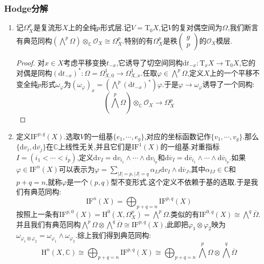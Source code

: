 \subsubsection{Hodge分解}

\begin{enumerate}
	\item 记$\Omega_X^p$是复流形$X$上的全纯$p$形式层.记$V=\mathrm{T}_0X$,记$V$的复对偶空间为$\Omega$,我们断言有典范同构$\left(\bigwedge^p\Omega\right)\otimes_{\mathbb{C}}\mathscr{O}_X\cong\Omega_X^p$.特别的有$\Omega_X^p$是秩$\left(\begin{array}{c}g\\p\end{array}\right)$的$\mathscr{O}_X$模层.
	\begin{proof}
		
		对$x\in X$考虑平移变换$t_{-x}$,它诱导了切空间同构$\mathrm{d}t_{-x}:\mathrm{T}_xX\to\mathrm{T}_0X$,它的对偶是同构$(\mathrm{d}t_{-x})^*:\Omega=\Omega_{X,0}^1\to\Omega_{X,x}^1$.任取$\varphi\in\bigwedge^p\Omega$,定义$X$上的一个平移不变全纯$p$形式$\omega_{\varphi}$为$(\omega_{\varphi})_x=\left(\bigwedge^p(\mathrm{d}t_{-x})^*\right)\varphi$.于是$\varphi\to\omega_{\varphi}$诱导了一个同构:
		$$\left(\bigwedge^p\Omega\right)\otimes_{\mathbb{C}}\mathscr{O}_X\to\Omega_X^p$$
	\end{proof}
    \item 定义$\mathrm{IF}^{p,q}(X)$.选取$V$的一组基$\{e_1,\cdots,e_g\}$,对应的坐标函数记作$\{v_1,\cdots,v_g\}$.那么$\{\mathrm{d}v_i,\mathrm{d}\overline{v_j}\}$在$\mathbb{C}$上线性无关,并且它们是$\mathrm{IF}^1(X)$的一组基.对重指标$I=(i_1<\cdots<i_p)$,定义$\mathrm{d}v_I=\mathrm{d}v_{i_1}\wedge\cdots\wedge\mathrm{d}v_{i_p}$和$\mathrm{d}\overline{v}_I=\mathrm{d}\overline{v}_{i_1}\wedge\cdots\wedge\mathrm{d}\overline{v}_{i_p}$.如果$\varphi\in\mathrm{IF}^n(X)$可以表示为$\varphi=\sum_{|I|=p,|J|=q}\alpha_{IJ}\mathrm{d}v_I\wedge\mathrm{d}\overline{v}_J$,其中$\alpha_{IJ}\in\mathbb{C}$和$p+q=n$,就称$\varphi$是一个$(p,q)$型不变形式.这个定义不依赖于基的选取.于是我们有典范同构:
    $$\mathrm{IF}^n(X)=\bigoplus_{p+q=n}\mathrm{IF}^{p,q}(X)$$
    按照上一条有$\mathrm{IF}^{p,0}(X)=\mathrm{H}^0(X,\Omega_X^p)=\bigwedge^p\Omega$.类似的有$\mathrm{IF}^{0,q}(X)\cong\bigwedge^q\overline{\Omega}$.并且我们有典范同构$\bigwedge^p\Omega\otimes\bigwedge^q\overline{\Omega}\cong\mathrm{IF}^{p,q}(X)$,此即把$\varphi_1\otimes\varphi_2$映为$\omega_{\varphi_1\otimes\varphi_2}=\omega_{\varphi_1}\wedge\omega_{\varphi_2}$.综上我们得到典范同构:$$\mathrm{H}^n(X,\mathbb{C})\cong\bigoplus_{p+q=n}\mathrm{IF}^{p,q}(X)\cong\bigoplus_{p+q=n}\bigwedge^p\Omega\otimes\bigwedge^q\overline{\Omega}$$

\end{enumerate}
